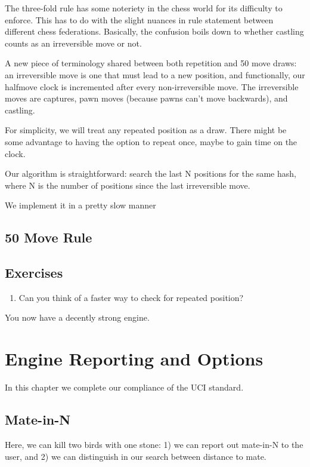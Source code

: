 \documentclass[letterpaper,11pt]{article}
\begin{document}
The three-fold rule has some noteriety in the chess world for its difficulty to enforce. This has 
to do with the slight nuances in rule statement between different chess federations.
Basically, the confusion boils down to whether castling counts as an irreversible move or not.

A new piece of terminology shared between both repetition and 50 move draws: an irreversible move is one that must lead to a new position, and functionally,
our halfmove clock is incremented after every non-irreversible move. The irreversible moves are 
captures, pawn moves (because pawns can't move backwards), and castling.

For simplicity, we will treat any repeated position as a draw. There might be some advantage 
to having the option to repeat once, maybe to gain time on the clock.

Our algorithm is straightforward: search the last N positions for the same hash, where N is the number of positions since the last
irreversible move.

We implement it in a pretty slow manner
\subsection{50 Move Rule}
\subsection{Exercises}
\begin{enumerate}
  \item Can you think of a faster way to check for repeated position?
\end{enumerate}



You now have a decently strong engine.


\section{Engine Reporting and Options}

In this chapter we complete our compliance of the UCI standard.

\subsection{Mate-in-N}

Here, we can kill two birds with one stone: 1) we can report out mate-in-N to the user, and 2) we can
distinguish in our search between distance to mate.
\end{document}

